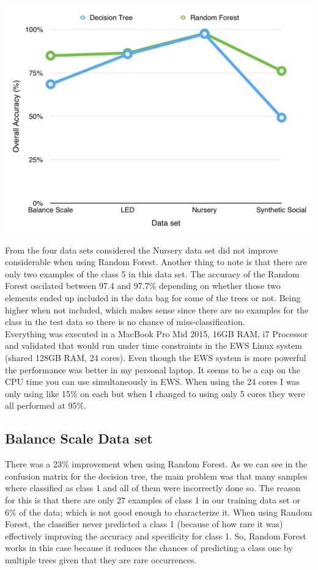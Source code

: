 \documentclass[11pt]{article}
\begin{document}
\begin{center}
\includegraphics[scale=0.7]{overall-test.png}
\end{center}

From the four data sets considered the Nursery data set did not improve considerable when using Random Forest. Another thing to note is that there are only two examples of the class 5 in this data set. The accuracy of the Random Forest oscilated between 97.4 and 97.7\% depending on whether those two elements ended up included in the data bag for some of the trees or not. Being higher when not included, which makes sense since there are no examples for the class in the test data so there is no chance of miss-classification. \\

Everything was executed in a MacBook Pro Mid 2015, 16GB RAM, i7 Processor and validated that would run under time constraints in the EWS Linux system (shared 128GB RAM, 24 cores). Even though the EWS system is more powerful the performance was better in my personal laptop. It seems to be a cap on the CPU time you can use simultaneously in EWS. When using the 24 cores I was only using like 15\% on each but when I changed to using only 5 cores they were all performed at 95\%. \\

\subsection*{Balance Scale Data set}
There was a 23\% improvement when using Random Forest. As we can see in the confusion matrix for the decision tree, the main problem was that many samples where classified as class 1 and all of them were incorrectly done so. The reason for this is that there are only 27 examples of class 1 in our training data set or 6\% of the data; which is not good enough to characterize it. When using Random Forest, the classifier never predicted a class 1 (because of how rare it was) effectively improving the accuracy and specificity for class 1. So, Random Forest works in this case because it reduces the chances of predicting a class one by multiple trees given that they are rare occurrences.
\end{document}
